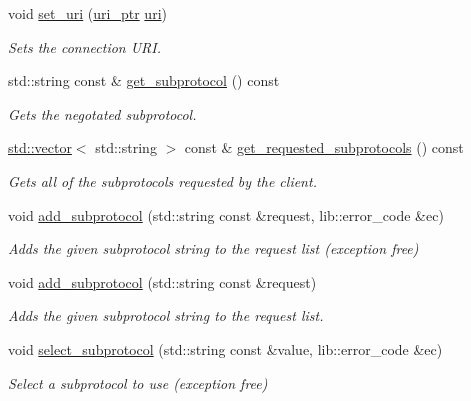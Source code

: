 \begin{DoxyCompactItemize}
void \mbox{\hyperlink{classwebsocketpp_1_1connection_ac5c81acf3be998662a3500a9be2c4d38}{set\+\_\+uri}} (\mbox{\hyperlink{namespacewebsocketpp_aae370ea5ac83a8ece7712cb39fc23f5b}{uri\+\_\+ptr}} \mbox{\hyperlink{classwebsocketpp_1_1uri}{uri}})
\begin{DoxyCompactList}\small\item\em Sets the connection U\+RI. \end{DoxyCompactList}\item 
std\+::string const  \& \mbox{\hyperlink{classwebsocketpp_1_1connection_ae8577184f6e4d82955cc38e1a9f8164b}{get\+\_\+subprotocol}} () const
\begin{DoxyCompactList}\small\item\em Gets the negotated subprotocol. \end{DoxyCompactList}\item 
\mbox{\hyperlink{classstd_1_1vector}{std\+::vector}}$<$ std\+::string $>$ const  \& \mbox{\hyperlink{classwebsocketpp_1_1connection_ae0f196cb11d4a38ef59f2173424a4d51}{get\+\_\+requested\+\_\+subprotocols}} () const
\begin{DoxyCompactList}\small\item\em Gets all of the subprotocols requested by the client. \end{DoxyCompactList}\item 
void \mbox{\hyperlink{classwebsocketpp_1_1connection_a36462b406f973e16d3107e786c6b9172}{add\+\_\+subprotocol}} (std\+::string const \&request, lib\+::error\+\_\+code \&ec)
\begin{DoxyCompactList}\small\item\em Adds the given subprotocol string to the request list (exception free) \end{DoxyCompactList}\item 
void \mbox{\hyperlink{classwebsocketpp_1_1connection_a37a41672dd87714eb045fd989f98cd26}{add\+\_\+subprotocol}} (std\+::string const \&request)
\begin{DoxyCompactList}\small\item\em Adds the given subprotocol string to the request list. \end{DoxyCompactList}\item 
void \mbox{\hyperlink{classwebsocketpp_1_1connection_a53e9587a711e543ed353e8ecec13d44c}{select\+\_\+subprotocol}} (std\+::string const \&value, lib\+::error\+\_\+code \&ec)
\begin{DoxyCompactList}\small\item\em Select a subprotocol to use (exception free) \end{DoxyCompactList}\item 

\end{DoxyCompactItemize}
